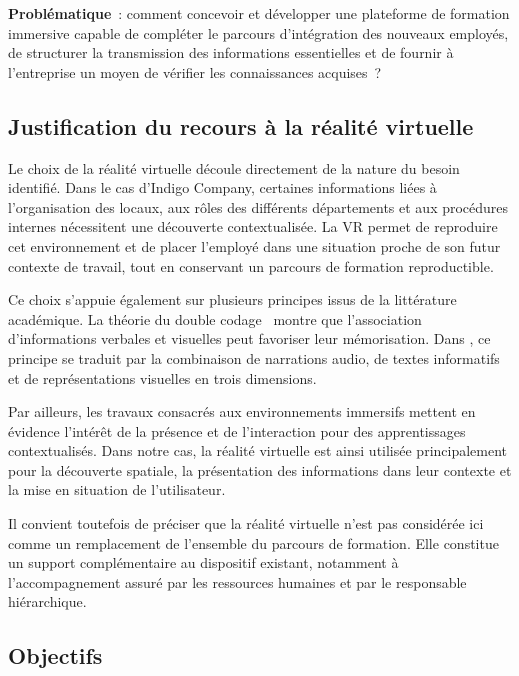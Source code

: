 \begin{notebox}
  \textbf{Problématique}~: comment concevoir et développer une plateforme de formation
  immersive capable de compléter le parcours d'intégration des nouveaux employés,
  de structurer la transmission des informations essentielles et de fournir à
  l'entreprise un moyen de vérifier les connaissances acquises~?
\end{notebox}

\subsection{Justification du recours à la réalité virtuelle}

Le choix de la réalité virtuelle découle directement de la nature du besoin identifié.
Dans le cas d'Indigo Company, certaines informations liées à l'organisation des locaux,
aux rôles des différents départements et aux procédures internes nécessitent une
découverte contextualisée. La VR permet de reproduire cet environnement et de placer
l'employé dans une situation proche de son futur contexte de travail, tout en conservant
un parcours de formation reproductible.

Ce choix s'appuie également sur plusieurs principes issus de la littérature académique.
La théorie du double codage~\cite{paivio1971,clarkpaivio1991} montre que l'association
d'informations verbales et visuelles peut favoriser leur mémorisation. Dans
\tynassit{}, ce principe se traduit par la combinaison de narrations audio, de textes
informatifs et de représentations visuelles en trois dimensions.

Par ailleurs, les travaux consacrés aux environnements immersifs
\cite{radianti2020,dalgarnolee2010} mettent en évidence l'intérêt de la présence et
de l'interaction pour des apprentissages contextualisés. Dans notre cas, la réalité
virtuelle est ainsi utilisée principalement pour la découverte spatiale, la présentation
des informations dans leur contexte et la mise en situation de l'utilisateur.

Il convient toutefois de préciser que la réalité virtuelle n'est pas considérée ici
comme un remplacement de l'ensemble du parcours de formation. Elle constitue un
support complémentaire au dispositif existant, notamment à l'accompagnement assuré
par les ressources humaines et par le responsable hiérarchique.

\subsection{Objectifs}

